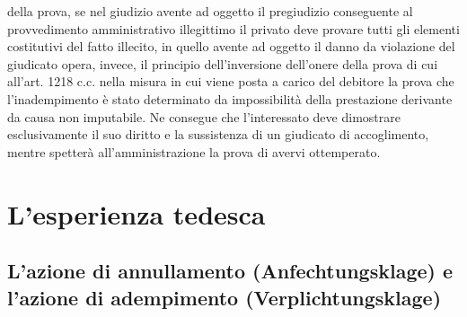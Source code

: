 \documentclass[12pt,it,a4paper,]{report}
\begin{document}
della prova, se nel giudizio avente ad oggetto il pregiudizio
conseguente al provvedimento amministrativo illegittimo il privato deve
provare tutti gli elementi costitutivi del fatto illecito, in quello
avente ad oggetto il danno da violazione del giudicato opera, invece, il
principio dell'inversione dell'onere della prova di cui all'art. 1218
c.c. nella misura in cui viene posta a carico del debitore la prova che
l'inadempimento è stato determinato da impossibilità della prestazione
derivante da causa non imputabile. Ne consegue che l'interessato deve
dimostrare esclusivamente il suo diritto e la sussistenza di un
giudicato di accoglimento, mentre spetterà all'amministrazione la prova
di avervi ottemperato.

\hypertarget{lesperienza-tedesca}{%
\chapter{L'esperienza tedesca}\label{lesperienza-tedesca}}

\hypertarget{lazione-di-annullamento-anfechtungsklage-e-lazione-di-adempimento-verplichtungsklage}{%
\section{L'azione di annullamento (Anfechtungsklage) e l'azione di
adempimento
(Verplichtungsklage)}\label{lazione-di-annullamento-anfechtungsklage-e-lazione-di-adempimento-verplichtungsklage}}
\end{document}
